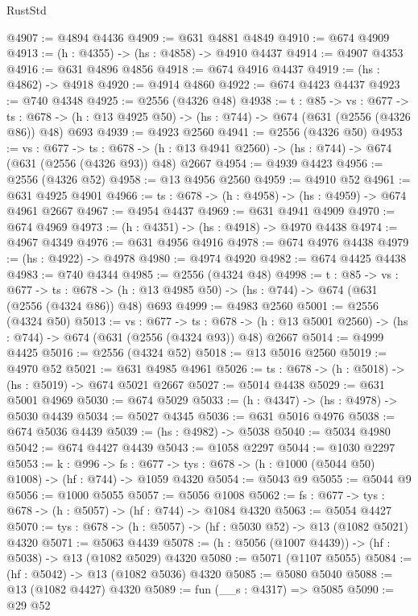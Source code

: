 \begin{lexlean}{RustStd}
\begin{coremodule}
@4907 := @4894 @4436
@4909 := @631 @4881 @4849
@4910 := @674 @4909
@4913 := (h : @4355) -> (hs : @4858) -> @4910 @4437
@4914 := @4907 @4353
@4916 := @631 @4896 @4856
@4918 := @674 @4916 @4437
@4919 := (hs : @4862) -> @4918
@4920 := @4914 @4860
@4922 := @674 @4423 @4437
@4923 := @740 @4348
@4925 := @2556 (@4326 @48)
@4938 := {t : @85} ->
  {vs : @677} ->
  {ts : @678} -> (h : @13 @4925 @50) -> (hs : @744) -> @674 (@631 (@2556 (@4326 @86)) @48) @693
@4939 := @4923 @2560
@4941 := @2556 (@4326 @50)
@4953 := {vs : @677} ->
  {ts : @678} -> (h : @13 @4941 @2560) -> (hs : @744) -> @674 (@631 (@2556 (@4326 @93)) @48) @2667
@4954 := @4939 @4423
@4956 := @2556 (@4326 @52)
@4958 := @13 @4956 @2560
@4959 := @4910 @52
@4961 := @631 @4925 @4901
@4966 := {ts : @678} -> (h : @4958) -> (hs : @4959) -> @674 @4961 @2667
@4967 := @4954 @4437
@4969 := @631 @4941 @4909
@4970 := @674 @4969
@4973 := (h : @4351) -> (hs : @4918) -> @4970 @4438
@4974 := @4967 @4349
@4976 := @631 @4956 @4916
@4978 := @674 @4976 @4438
@4979 := (hs : @4922) -> @4978
@4980 := @4974 @4920
@4982 := @674 @4425 @4438
@4983 := @740 @4344
@4985 := @2556 (@4324 @48)
@4998 := {t : @85} ->
  {vs : @677} ->
  {ts : @678} -> (h : @13 @4985 @50) -> (hs : @744) -> @674 (@631 (@2556 (@4324 @86)) @48) @693
@4999 := @4983 @2560
@5001 := @2556 (@4324 @50)
@5013 := {vs : @677} ->
  {ts : @678} -> (h : @13 @5001 @2560) -> (hs : @744) -> @674 (@631 (@2556 (@4324 @93)) @48) @2667
@5014 := @4999 @4425
@5016 := @2556 (@4324 @52)
@5018 := @13 @5016 @2560
@5019 := @4970 @52
@5021 := @631 @4985 @4961
@5026 := {ts : @678} -> (h : @5018) -> (hs : @5019) -> @674 @5021 @2667
@5027 := @5014 @4438
@5029 := @631 @5001 @4969
@5030 := @674 @5029
@5033 := (h : @4347) -> (hs : @4978) -> @5030 @4439
@5034 := @5027 @4345
@5036 := @631 @5016 @4976
@5038 := @674 @5036 @4439
@5039 := (hs : @4982) -> @5038
@5040 := @5034 @4980
@5042 := @674 @4427 @4439
@5043 := @1058 @2297
@5044 := @1030 @2297
@5053 := {k : @996} ->
  {fs : @677} -> {tys : @678} -> (h : @1000 (@5044 @50) @1008) -> (hf : @744) -> @1059 @4320
@5054 := @5043 @9
@5055 := @5044 @9
@5056 := @1000 @5055
@5057 := @5056 @1008
@5062 := {fs : @677} -> {tys : @678} -> (h : @5057) -> (hf : @744) -> @1084 @4320
@5063 := @5054 @4427
@5070 := {tys : @678} -> (h : @5057) -> (hf : @5030 @52) -> @13 (@1082 @5021) @4320
@5071 := @5063 @4439
@5078 := (h : @5056 (@1007 @4439)) -> (hf : @5038) -> @13 (@1082 @5029) @4320
@5080 := @5071 (@1107 @5055)
@5084 := (hf : @5042) -> @13 (@1082 @5036) @4320
@5085 := @5080 @5040
@5088 := @13 (@1082 @4427) @4320
@5089 := fun (__s : @4317) => @5085
@5090 := @29 @52

\end{coremodule}
\end{lexlean}
